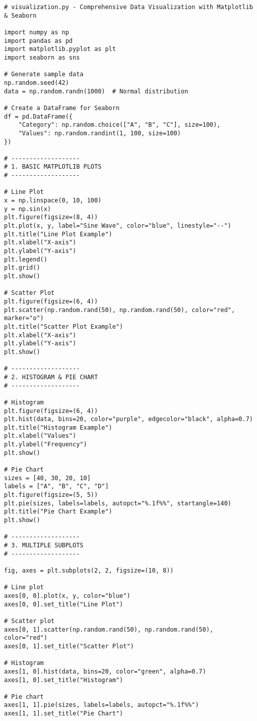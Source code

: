 \begin{verbatim}
# visualization.py - Comprehensive Data Visualization with Matplotlib & Seaborn

import numpy as np
import pandas as pd
import matplotlib.pyplot as plt
import seaborn as sns

# Generate sample data
np.random.seed(42)
data = np.random.randn(1000)  # Normal distribution

# Create a DataFrame for Seaborn
df = pd.DataFrame({
    "Category": np.random.choice(["A", "B", "C"], size=100),
    "Values": np.random.randint(1, 100, size=100)
})

# -------------------
# 1. BASIC MATPLOTLIB PLOTS
# -------------------

# Line Plot
x = np.linspace(0, 10, 100)
y = np.sin(x)
plt.figure(figsize=(8, 4))
plt.plot(x, y, label="Sine Wave", color="blue", linestyle="--")
plt.title("Line Plot Example")
plt.xlabel("X-axis")
plt.ylabel("Y-axis")
plt.legend()
plt.grid()
plt.show()

# Scatter Plot
plt.figure(figsize=(6, 4))
plt.scatter(np.random.rand(50), np.random.rand(50), color="red", marker="o")
plt.title("Scatter Plot Example")
plt.xlabel("X-axis")
plt.ylabel("Y-axis")
plt.show()

# -------------------
# 2. HISTOGRAM & PIE CHART
# -------------------

# Histogram
plt.figure(figsize=(6, 4))
plt.hist(data, bins=20, color="purple", edgecolor="black", alpha=0.7)
plt.title("Histogram Example")
plt.xlabel("Values")
plt.ylabel("Frequency")
plt.show()

# Pie Chart
sizes = [40, 30, 20, 10]
labels = ["A", "B", "C", "D"]
plt.figure(figsize=(5, 5))
plt.pie(sizes, labels=labels, autopct="%.1f%%", startangle=140)
plt.title("Pie Chart Example")
plt.show()

# -------------------
# 3. MULTIPLE SUBPLOTS
# -------------------

fig, axes = plt.subplots(2, 2, figsize=(10, 8))

# Line plot
axes[0, 0].plot(x, y, color="blue")
axes[0, 0].set_title("Line Plot")

# Scatter plot
axes[0, 1].scatter(np.random.rand(50), np.random.rand(50), color="red")
axes[0, 1].set_title("Scatter Plot")

# Histogram
axes[1, 0].hist(data, bins=20, color="green", alpha=0.7)
axes[1, 0].set_title("Histogram")

# Pie chart
axes[1, 1].pie(sizes, labels=labels, autopct="%.1f%%")
axes[1, 1].set_title("Pie Chart")


\end{verbatim}

